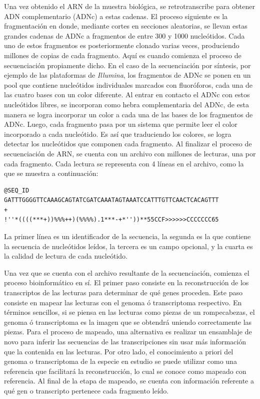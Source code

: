 \documentclass[12pt,twoside]{reedthesis}
\begin{document}
\par

Una vez obtenido el ARN de la muestra biológica, se retrotranscribe para obtener ADN complementario (ADNc) a estas cadenas. El proceso siguiente es la fragmentación en donde, mediante cortes en secciones aleatorias, se llevan estas grandes cadenas de ADNc a fragmentos de entre 300 y 1000 nucleótidos. Cada uno de estos fragmentos es posteriormente clonado varias veces, produciendo millones de copias de cada fragmento. Aquí es cuando comienza el proceso de secuenciación propiamente dicho. En el caso de la secuenciación por síntesis, por ejemplo de las plataformas de \emph{Illumina}, los fragmentos de ADNc se ponen en un pool que contiene nucleótidos individuales marcados con fluoróforos, cada una de las cuatro bases con un color diferente. Al entrar en contacto el ADNc con estos nucleótidos libres, se incorporan como hebra complementaria del ADNc, de esta manera se logra incorporar un color a cada una de las bases de los fragmentos de ADNc. Luego, cada fragmento pasa por un sistema que permite leer el color incorporado a cada nucleótido. Es así que traduciendo los colores, se logra detectar los nucleótidos que componen cada fragmento. Al finalizar el proceso de secuenciación de ARN, se cuenta con un archivo con millones de lecturas, una por cada fragmento. Cada lectura se representa con 4 líneas en el archivo, como la que se muestra a continuación:
\begin{verbatim}
@SEQ_ID
GATTTGGGGTTCAAAGCAGTATCGATCAAATAGTAAATCCATTTGTTCAACTCACAGTTT
+
!''*((((***+))%%%++)(%%%%).1***-+*''))**55CCF>>>>>>CCCCCCC65
\end{verbatim}
La primer línea es un identificador de la secuencia, la segunda es la que contiene la secuencia de nucleótidos leídos, la tercera es un campo opcional, y la cuarta es la calidad de lectura de cada nucleótido.

\par

Una vez que se cuenta con el archivo resultante de la secuenciación, comienza el proceso bioinformático en sí. El primer paso consiste en la reconstrucción de los transcriptos de las lecturas para determinar de qué genes proceden. Este paso consiste en mapear las lecturas con el genoma ó transcriptoma respectivo. En términos sencillos, si se piensa en las lecturas como piezas de un rompecabezas, el genoma ó transcriptoma es la imagen que se obtendrá uniendo correctamente las piezas. Para el proceso de mapeado, una alternativa es realizar un ensamblaje de novo para inferir las secuencias de las transcripciones sin usar más información que la contenida en las lecturas. Por otro lado, el conocimiento a priori del genoma o transcriptoma de la especie en estudio se puede utilizar como una referencia que facilitará la reconstrucción, lo cual se conoce como mapeado con referencia. Al final de la etapa de mapeado, se cuenta con información referente a qué gen o transcripto pertenece cada fragmento leído.
\end{document}
